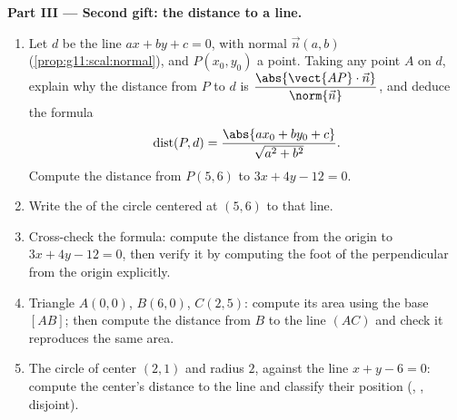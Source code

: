 \begin{problem}
\medskip
\noindent\textbf{Part III --- Second gift: the distance to a
line.}
\begin{enumerate}[resume]
  \item Let $d$ be the line $ax + by + c = 0$, with normal
         $\vec n(a, b)$ (\cref{prop:g11:scal:normal}),
        and $P(x_0, y_0)$ a point. Taking any point $A$ on $d$,
        explain why the distance from $P$ to $d$ is
        $\dfrac{\abs{\vect{AP} \cdot \vec n}}{\norm{\vec n}}$,
        and deduce the formula
        \[
        \operatorname{dist}(P, d)
        = \frac{\abs{a x_0 + b y_0 + c}}{\sqrt{a^2 + b^2}} .
        \]
        Compute the distance from $P(5, 6)$ to
        $3x + 4y - 12 = 0$.
  \item Write the  of the circle centered at $(5, 6)$
         to that line.
  \item Cross-check the formula: compute the distance from the
        origin to $3x + 4y - 12 = 0$, then verify it by
        computing the foot of the perpendicular from the origin
        explicitly.
  \item Triangle $A(0,0)$, $B(6,0)$, $C(2,5)$: compute its area
        using the base $[AB]$; then compute the distance from
        $B$ to the line $(AC)$ and check it reproduces the same
        area.
  \item The circle of center $(2, 1)$ and radius $2$, against
        the line $x + y - 6 = 0$: compute the center's distance
        to the line and classify their position (,
        , disjoint).
\end{enumerate}


\end{problem}
